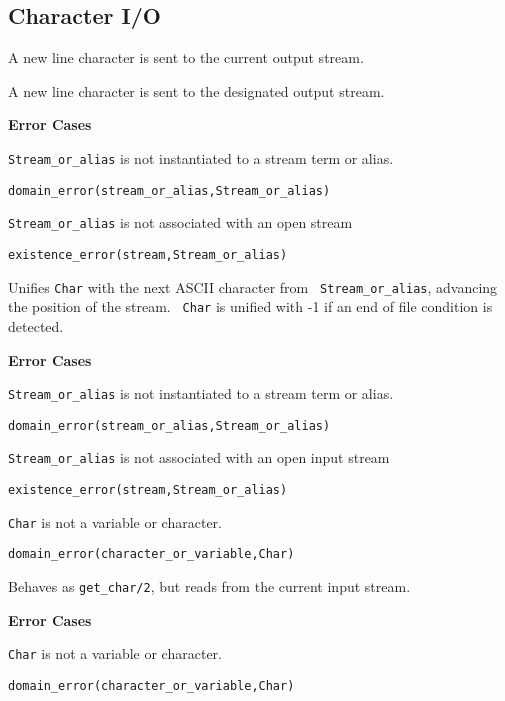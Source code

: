 \subsection{Character I/O}
\begin{description}

A new line character is sent to the current output stream.

A new line character is sent to the designated output stream.

{\bf Error Cases}
\bi
\item 	{\tt Stream\_or\_alias} is not instantiated to a stream term or alias.
\bi
\item 	{\tt domain\_error(stream\_or\_alias,Stream\_or\_alias)}
\ei
\item 	{\tt Stream\_or\_alias} is not associated with an open stream
\bi
\item 	{\tt existence\_error(stream,Stream\_or\_alias)}
\ei
\ei


   Unifies {\tt Char} with the next ASCII character from {\tt
   Stream\_or\_alias}, advancing the position of the stream.  {\tt
   Char} is unified with -1 if an end of file condition is detected.

{\bf Error Cases}
\bi
\item 	{\tt Stream\_or\_alias} is not instantiated to a stream term or alias.
\bi
\item 	{\tt domain\_error(stream\_or\_alias,Stream\_or\_alias)}
\ei
\item 	{\tt Stream\_or\_alias} is not associated with an open input stream
\bi
\item 	{\tt existence\_error(stream,Stream\_or\_alias)}
\ei
\item 	{\tt Char} is not a variable or character.
\bi
\item 	{\tt domain\_error(character\_or\_variable,Char)}
\ei
\ei

%
Behaves as {\tt get\_char/2}, but reads from the current input stream.

{\bf Error Cases}
\bi
\item 	{\tt Char} is not a variable or character.
\bi
\item 	{\tt domain\_error(character\_or\_variable,Char)}
\ei
\ei


\end{description}
